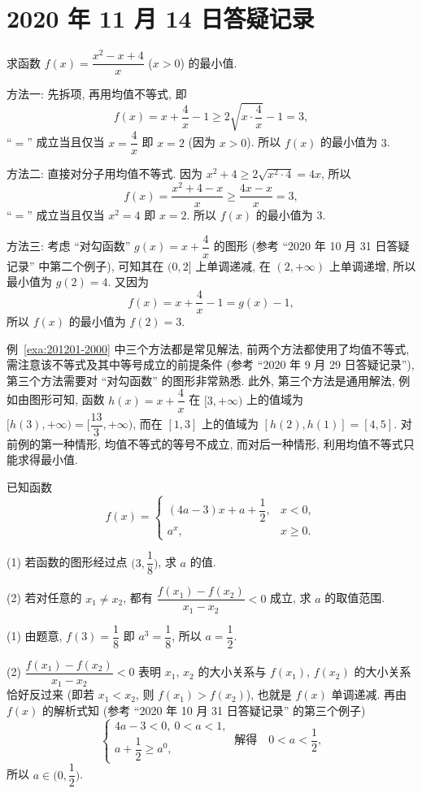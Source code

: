 \section{2020 年 11 月 14 日答疑记录}

\begin{example}\label{exa:201201-2000}
    求函数 $f(x)= \dfrac{x^2-x+4}x$ ($x>0$) 的最小值.
\end{example}
\begin{solution}
    方法一: 先拆项, 再用均值不等式, 即
    \[f(x)= x+\frac4x-1\geqslant 2\sqrt{x\cdot\frac4x}-1=3,\]
    ``$=$'' 成立当且仅当 $x=\dfrac4x$ 即 $x=2$ (因为 $x>0$). 所以 $f(x)$ 的最小值为 $3$.
    
    方法二: 直接对分子用均值不等式. 因为 $x^2+4\geqslant 2\sqrt{x^2\cdot 4}= 4x$, 所以
    \[f(x)= \dfrac{x^2+4-x}x\geqslant \frac{4x-x}x= 3,\]
    ``$=$'' 成立当且仅当 $x^2= 4$ 即 $x=2$. 所以 $f(x)$ 的最小值为 $3$.
    
    方法三: 考虑 ``对勾函数'' $g(x)=x+\dfrac4x$ 的图形 (参考 ``2020 年 10 月 31 日答疑记录'' 中第二个例子), 可知其在 $(0,2]$ 上单调递减, 在 $(2,+\infty)$ 上单调递增, 所以最小值为 $g(2)=4$. 又因为 
    \[f(x)=x+\frac4x-1=g(x)-1,\]
    所以 $f(x)$ 的最小值为 $f(2)=3$.
\end{solution}

例~\ref{exa:201201-2000} 中三个方法都是常见解法, 前两个方法都使用了均值不等式, 需注意该不等式及其中等号成立的前提条件 (参考 ``2020 年 9 月 29 日答疑记录''), 第三个方法需要对 ``对勾函数'' 的图形非常熟悉. 此外, 第三个方法是通用解法, 例如由图形可知, 函数 $h(x)=x+\dfrac4x$ 在 $[3,+\infty)$ 上的值域为 $[h(3),+\infty)= \biggl[\dfrac{13}3,+\infty\biggr)$, 而在 $[1,3]$ 上的值域为 $[h(2),h(1)]= [4,5]$. 对前例的第一种情形, 均值不等式的等号不成立, 而对后一种情形, 利用均值不等式只能求得最小值.

\begin{example}\label{exa:201201-2020}
    已知函数
    \[f(x)= \begin{cases}
        (4a-3)x+a+\dfrac12, & x<0,\\
        a^x, & x\geqslant 0.
    \end{cases}\]
    
    (1) 若函数的图形经过点 $\biggl(3,\dfrac18\biggr)$, 求 $a$ 的值.
    
    (2) 若对任意的 $x_1\neq x_2$, 都有 $\dfrac{f(x_1)-f(x_2)}{x_1-x_2}<0$ 成立, 求 $a$ 的取值范围.
\end{example}
\begin{solution}
    (1) 由题意, $f(3)= \dfrac18$ 即 $a^3=\dfrac18$, 所以 $a=\dfrac12$.
    
    (2) $\dfrac{f(x_1)-f(x_2)}{x_1-x_2}<0$ 表明 $x_1$, $x_2$ 的大小关系与 $f(x_1)$, $f(x_2)$ 的大小关系恰好反过来 (即若 $x_1<x_2$, 则 $f(x_1)>f(x_2)$), 也就是 $f(x)$ 单调递减. 再由 $f(x)$ 的解析式知 (参考 ``2020 年 10 月 31 日答疑记录'' 的第三个例子)
    \[\left\{\!\!\begin{array}{l}
        4a-3<0,\ 0<a<1,\\
        a+\dfrac12\geqslant a^0,
        \end{array}\right.\ \text{解得}\quad 0<a<\frac12,\]
    所以 $a\in\biggl(0,\dfrac12\biggr)$.
\end{solution}


